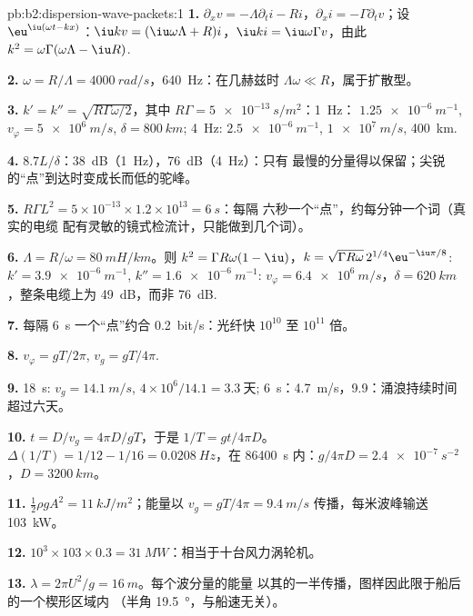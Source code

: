 \begin{solution}{pb:b2:dispersion-wave-packets:1}
\textbf{1.} $\partial_xv = -\Lambda\partial_ti - Ri$，$\partial_xi = -\Gamma\partial_tv$；设
$\eu^{\iu(\omega t - kx)}$：$\iu kv = (\iu\omega\Lambda + R)i$，$\iu ki = \iu\omega\Gamma v$，由此
$k^2 = \omega\Gamma(\omega\Lambda - \iu R)$.

\textbf{2.} $\omega = R/\Lambda = \qty{4000}{rad/s}$，\qty{640}{Hz}：在几赫兹时 $\Lambda\omega
\ll R$，属于扩散型。

\textbf{3.} $k' = k'' = \sqrt{R\Gamma\omega/2}$，其中 $R\Gamma = \qty{5e-13}{s/m^2}$：\qty{1}{Hz}：
$\qty{1.25e-6}{m^{-1}}$, $v_\varphi = \qty{5e6}{m/s}$, $\delta = \qty{800}{km}$; \qty{4}{Hz}:
$\qty{2.5e-6}{m^{-1}}$, $\qty{1e7}{m/s}$, \qty{400}{km}.

\textbf{4.} $8.7L/\delta$：\qty{38}{dB}（\qty{1}{Hz}），\qty{76}{dB}（\qty{4}{Hz}）：只有
最慢的分量得以保留；尖锐的“点”到达时变成长而低的驼峰。

\textbf{5.} $R\Gamma L^2 = 5 \times 10^{-13} \times 1.2 \times 10^{13} = \qty{6}{s}$：每隔
六秒一个“点”，约每分钟一个词（真实的电缆
配有灵敏的镜式检流计，只能做到几个词）。

\textbf{6.} $\Lambda = R/\omega = \qty{80}{mH/km}$。则 $k^2 = \Gamma R\omega(1 - \iu)$，$k = \sqrt{\Gamma R\omega}
\,2^{1/4}\eu^{-\iu\pi/8}$: $k' = \qty{3.9e-6}{m^{-1}}$, $k'' = \qty{1.6e-6}{m^{-1}}$: $v_\varphi =
\qty{6.4e6}{m/s}$，$\delta = \qty{620}{km}$，整条电缆上为 \qty{49}{dB}，而非
\qty{76}{dB}.

\textbf{7.} 每隔 \qty{6}{s} 一个“点”约合 \qty{0.2}{bit/s}：光纤快
$10^{10}$ 至 $10^{11}$ 倍。

\textbf{8.} $v_\varphi = gT/2\pi$, $v_g = gT/4\pi$.

\textbf{9.} \qty{18}{s}: $v_g = \qty{14.1}{m/s}$, $4 \times 10^6/14.1 = \qty{3.3}{\text{天}}$;
\qty{6}{s}：\qty{4.7}{m/s}，\qty{9.9}{}：涌浪持续时间超过六天。

\textbf{10.} $t = D/v_g = 4\pi D/gT$，于是 $1/T = gt/4\pi D$。$\Delta(1/T) = 1/12 - 1/16
= \qty{0.0208}{Hz}$，在 \qty{86400}{s} 内：$g/4\pi D = \qty{2.4e-7}{s^{-2}}$，$D = \qty{3200}{km}$。

\textbf{11.} $\tfrac12\rho gA^2 = \qty{11}{kJ/m^2}$；能量以 $v_g = gT/4\pi =
\qty{9.4}{m/s}$ 传播，每米波峰输送 \qty{103}{kW}。

\textbf{12.} $10^3 \times 103 \times 0.3 = \qty{31}{MW}$：相当于十台风力涡轮机。

\textbf{13.} $\lambda = 2\pi U^2/g = \qty{16}{m}$。每个波分量的能量
以其的一半传播，图样因此限于船后的一个楔形区域内
（半角 \qty{19.5}{\degree}，与船速无关）。


\end{solution}
